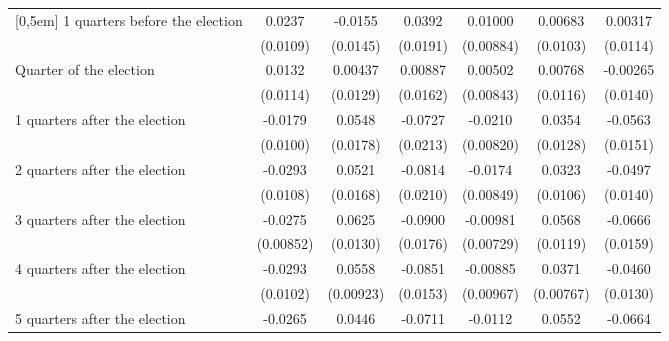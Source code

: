 \begin{table}[!ht]
\begin{tabular}{l*{6}{c}}
[0,5em]
 1 quarters before the election&      0.0237\sym{*}  &     -0.0155         &      0.0392\sym{*}  &     0.01000         &     0.00683         &     0.00317         \\
                    &    (0.0109)         &    (0.0145)         &    (0.0191)         &   (0.00884)         &    (0.0103)         &    (0.0114)         \\
[0,5em]
Quarter of the election&      0.0132         &     0.00437         &     0.00887         &     0.00502         &     0.00768         &    -0.00265         \\
                    &    (0.0114)         &    (0.0129)         &    (0.0162)         &   (0.00843)         &    (0.0116)         &    (0.0140)         \\
[0,5em]
 1 quarters after the election&     -0.0179         &      0.0548\sym{**} &     -0.0727\sym{***}&     -0.0210\sym{*}  &      0.0354\sym{**} &     -0.0563\sym{***}\\
                    &    (0.0100)         &    (0.0178)         &    (0.0213)         &   (0.00820)         &    (0.0128)         &    (0.0151)         \\
[0,5em]
 2 quarters after the election&     -0.0293\sym{**} &      0.0521\sym{**} &     -0.0814\sym{***}&     -0.0174\sym{*}  &      0.0323\sym{**} &     -0.0497\sym{***}\\
                    &    (0.0108)         &    (0.0168)         &    (0.0210)         &   (0.00849)         &    (0.0106)         &    (0.0140)         \\
[0,5em]
 3 quarters after the election&     -0.0275\sym{**} &      0.0625\sym{***}&     -0.0900\sym{***}&    -0.00981         &      0.0568\sym{***}&     -0.0666\sym{***}\\
                    &   (0.00852)         &    (0.0130)         &    (0.0176)         &   (0.00729)         &    (0.0119)         &    (0.0159)         \\
[0,5em]
 4 quarters after the election&     -0.0293\sym{**} &      0.0558\sym{***}&     -0.0851\sym{***}&    -0.00885         &      0.0371\sym{***}&     -0.0460\sym{***}\\
                    &    (0.0102)         &   (0.00923)         &    (0.0153)         &   (0.00967)         &   (0.00767)         &    (0.0130)         \\
[0,5em]
 5 quarters after the election&     -0.0265\sym{*}  &      0.0446\sym{**} &     -0.0711\sym{***}&     -0.0112         &      0.0552\sym{***}&     -0.0664\sym{***}\\

\end{tabular}
\end{table}
